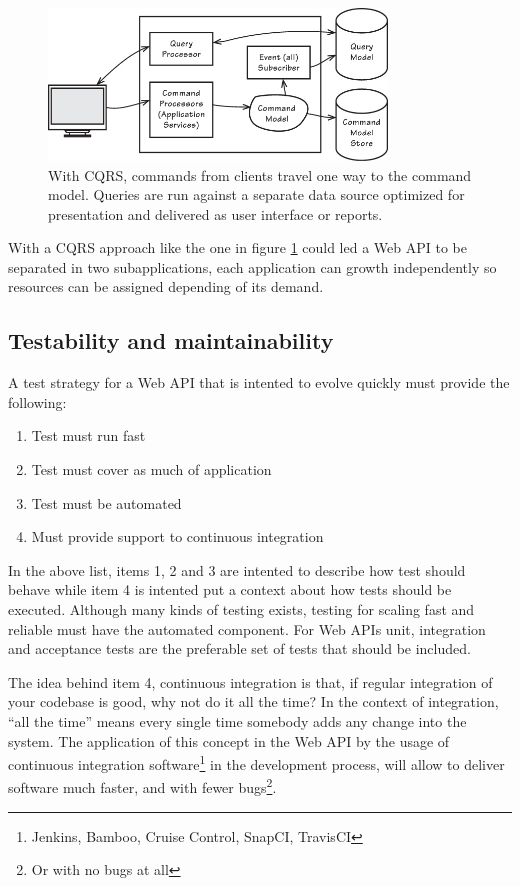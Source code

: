 \documentclass[10pt,article]{IEEEtran}
\begin{document}
\begin{figure}[h]
    \centering
    \includegraphics[width=9cm]{cqrs}
    \caption{With CQRS, commands from clients travel one way to the command model. Queries are run against a separate data source optimized for presentation and delivered as user interface or reports\cite{vernon:iddd}.}
    \label{fig:cqrs}
\end{figure}

With a CQRS approach like the one in figure \ref{fig:cqrs} could led a Web API to be separated in two subapplications, each application can growth independently so resources can be assigned depending of its demand. 

\subsection{Testability and maintainability}
A test strategy for a Web API that is intented to evolve quickly must provide the following:
\begin{enumerate}
    \item
    Test must run fast
    \item
    Test must cover as much of application
    \item
    Test must be automated
    \item
    Must provide support to continuous integration
\end{enumerate}

In the above list, items 1, 2 and 3 are intented to describe how test should behave while item 4 is intented put a context about how tests should be executed. Although many kinds of testing exists\cite{humble}, testing for scaling fast and reliable must have the automated component. For Web APIs unit, integration and acceptance tests are the preferable set of tests that should be included.

The idea behind item 4, continuous integration is that, if regular integration of your codebase is good, why not do it all the time? In the context of integration, ``all the time'' means every single time somebody adds any change into the system\cite{beck:ci}. The application of this concept in the Web API by the usage of continuous integration software\footnote{Jenkins, Bamboo, Cruise Control, SnapCI, TravisCI} in the development process, will allow to deliver software much faster, and with fewer bugs\footnote{Or with no bugs at all}. 
\end{document}
